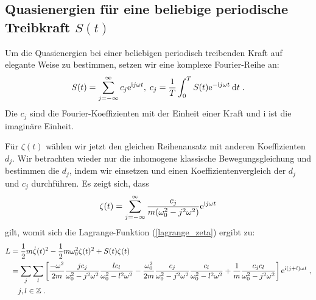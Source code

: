     \subsection{Quasienergien für eine beliebige periodische Treibkraft $S(t)$}
      \label{epsilon_bel_kraft}
      Um die Quasienergien bei einer beliebigen periodisch treibenden Kraft auf elegante Weise zu bestimmen,
      setzen wir eine komplexe Fourier-Reihe an:
      \begin{equation}
        S(t) = \sum_{j=-\infty}^\infty c_j \text e^{\text ij\omega t}, \; c_j = \frac{1}{T} \int_0^T S(t) \text e^{-\text ij\omega t} \: \text d t \; .
      \end{equation}
      Die $c_j$ sind die Fourier-Koeffizienten mit der Einheit einer Kraft und i ist die imaginäre Einheit.
\iffalse
      Für $\zeta(t)$ wählen wir jetzt ebenfalls einen Reihenansatz:
      \begin{equation}
        \zeta(t) = \sum_{j=-\infty}^\infty d_j \text e^{\text ij\omega t} \; .
      \end{equation}
\fi
      Für $\zeta(t)$ wählen wir jetzt den gleichen Reihenansatz mit anderen Koeffizienten $d_j$.
      Wir betrachten wieder nur die inhomogene klassische Bewegungsgleichung und bestimmen die $d_j$, indem wir einsetzen und einen Koeffizientenvergleich der $d_j$ und $c_j$ durchführen.
      Es zeigt sich, dass
      \begin{equation}
        \zeta(t) = \sum_{j=-\infty}^\infty \frac{c_j}{m(\omega_0^2-j^2\omega^2)} \text e^{\text ij\omega t}
        \label{zeta_bel_kraft}
      \end{equation}
      gilt, womit sich die Lagrange-Funktion (\ref{lagrange_zeta}) ergibt zu:
      \begin{align}
        \begin{split}
          L &= \frac{1}{2}m\dot \zeta(t)^2 - \frac{1}{2}m\omega_0^2\zeta(t)^2 + S(t)\zeta(t) \notag\\
           &=\sum_j \sum_l \left[ \frac{-\omega^2}{2m} \frac{jc_j}{\omega_0^2-j^2\omega^2} \frac{lc_l}{\omega_0^2-l^2\omega^2}
           -\frac{\omega_0^2}{2m} \frac{c_j}{\omega_0^2-j^2\omega^2} \frac{c_l}{\omega_0^2-l^2\omega^2} %
            + \frac{1}{m} \frac{c_jc_l}{\omega_0^2-j^2\omega^2} \right] \text e^{\text i(j+l)\omega t}  \; , \notag\\
             &\quad j,l \in \mathbb{Z} \; .
         \end{split}
       \end{align}
